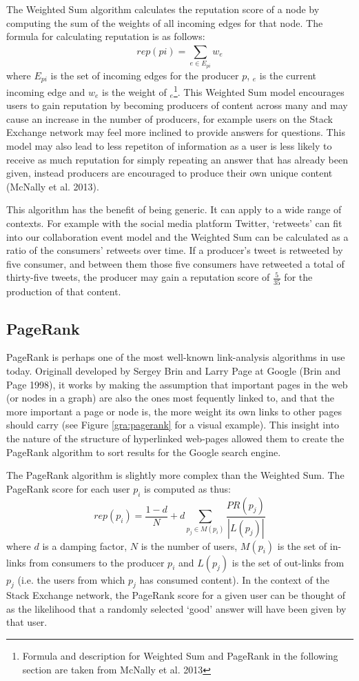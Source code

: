 \documentclass[]{final_report}
\begin{document}
The Weighted Sum algorithm calculates the reputation score of a node by computing the sum of the weights of all incoming edges for that node. The formula for calculating reputation is as follows:
\[
rep(pi) = \sum_{e\in E_{pi}}^{} w_{e} 
\]
where $E_{pi}$ is the set of incoming edges for the producer $p$, $_{e}$ is the current incoming edge and $w_{e}$ is the weight of $_{e}$\footnote{Formula and description for Weighted Sum and PageRank in the following section are taken from McNally et al. 2013}. This Weighted Sum model encourages users to gain reputation by becoming producers of content across many and may cause an increase in the number of producers, for example users on the Stack Exchange network may feel more inclined to provide answers for questions. This model may also lead to less repetiton of information as a user is less likely to receive as much reputation for simply repeating an answer that has already been given, instead producers are encouraged to produce their own unique content (McNally et al. 2013).

This algorithm has the benefit of being generic. It can apply to a wide range of contexts. For example with the social media platform Twitter, `retweets' can fit into our collaboration event model and the Weighted Sum can be calculated as a ratio of the consumers' retweets over time. If a producer's tweet is retweeted by five consumer, and between them those five consumers have retweeted a total of thirty-five tweets, the producer may gain a reputation score of $\frac{5}{35}$ for the production of that content.

\subsection{PageRank}

PageRank is perhaps one of the most well-known link-analysis algorithms in use today. Originall developed by Sergey Brin and Larry Page at Google (Brin and Page 1998), it works by making the assumption that important pages in the web (or nodes in a graph) are also the ones most fequently linked to, and that the more important a page or node is, the more weight its own links to other pages should carry (see Figure \ref{gra:pagerank} for a visual example). This insight into the nature of the structure of hyperlinked web-pages allowed them to create the PageRank algorithm to sort results for the Google search engine.

The PageRank algorithm is slightly more complex than the Weighted Sum. The PageRank score for each user $p_{i}$ is computed as thus:
\[
rep(p_{i}) = \frac{1 - d}{N} + d \sum_{p_{j} \in M(p_{i})} \frac{PR(p_{j})}{|L(p_{j})|}
\]
where $d$ is a damping factor, $N$ is the number of users, $M(p_{i})$ is the set of in-links from consumers to the producer $p_{i}$ and $L(p_{j})$ is the set of out-links from $p_{j}$ (i.e. the users from which $p_{j}$ has consumed content). In the context of the Stack Exchange network, the PageRank score for a given user can be thought of as the likelihood that a randomly selected `good' answer will have been given by that user.
\end{document}
